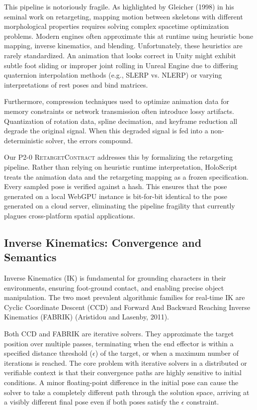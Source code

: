 \documentclass[sigconf,nonacm]{acmart}
\newcommand{\retargetcontract}{\textsc{RetargetContract}}
\begin{document}
This pipeline is notoriously fragile. As highlighted by Gleicher (1998) in his
seminal work on retargeting, mapping motion between skeletons with different
morphological properties requires solving complex spacetime optimization
problems. Modern engines often approximate this at runtime using heuristic bone
mapping, inverse kinematics, and blending. Unfortunately, these heuristics are
rarely standardized. An animation that looks correct in Unity might exhibit
subtle foot sliding or improper joint rolling in Unreal Engine due to differing
quaternion interpolation methods (e.g., SLERP vs. NLERP) or varying
interpretations of rest poses and bind matrices.

Furthermore, compression techniques used to optimize animation data for memory
constraints or network transmission often introduce lossy artifacts.
Quantization of rotation data, spline decimation, and keyframe reduction all
degrade the original signal. When this degraded signal is fed into a non-
deterministic solver, the errors compound.

Our P2-0 \retargetcontract{} addresses this by formalizing the retargeting
pipeline. Rather than relying on heuristic runtime interpretation, HoloScript
treats the animation data and the retargeting mapping as a frozen specification.
Every sampled pose is verified against a hash. This ensures that the pose
generated on a local WebGPU instance is bit-for-bit identical to the pose
generated on a cloud server, eliminating the pipeline fragility that currently
plagues cross-platform spatial applications.

\subsection{Inverse Kinematics: Convergence and Semantics} Inverse Kinematics
(IK) is fundamental for grounding characters in their environments, ensuring
foot-ground contact, and enabling precise object manipulation. The two most
prevalent algorithmic families for real-time IK are Cyclic Coordinate Descent
(CCD) and Forward And Backward Reaching Inverse Kinematics (FABRIK) (Aristidou
and Lasenby, 2011).

Both CCD and FABRIK are iterative solvers. They approximate the target position
over multiple passes, terminating when the end effector is within a specified
distance threshold ($\epsilon$) of the target, or when a maximum number of
iterations is reached. The core problem with iterative solvers in a distributed
or verifiable context is that their convergence paths are highly sensitive to
initial conditions. A minor floating-point difference in the initial pose can
cause the solver to take a completely different path through the solution space,
arriving at a visibly different final pose even if both poses satisfy the
$\epsilon$ constraint.
\end{document}

